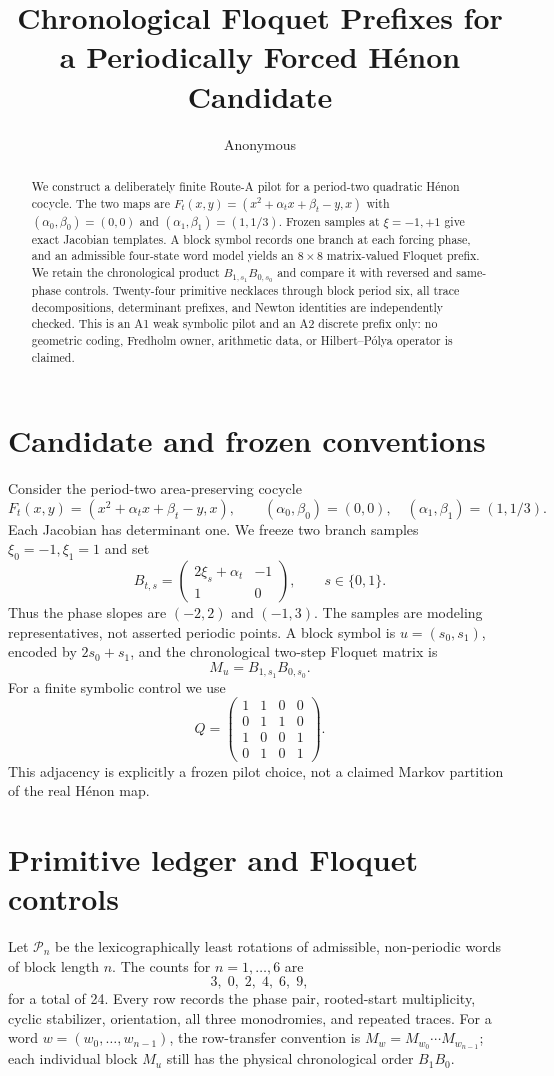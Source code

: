\documentclass[10pt]{article}
\title{Chronological Floquet Prefixes for a Periodically Forced H\'enon Candidate}
\author{Anonymous}
\date{}
\begin{document}
\maketitle
\begin{abstract}
We construct a deliberately finite Route-A pilot for a period-two quadratic
H\'enon cocycle.  The two maps are
$F_t(x,y)=(x^2+\alpha_t x+\beta_t-y,x)$ with
$(\alpha_0,\beta_0)=(0,0)$ and $(\alpha_1,\beta_1)=(1,1/3)$.
Frozen samples at $\xi=-1,+1$ give exact Jacobian templates.  A block symbol
records one branch at each forcing phase, and an admissible four-state word
model yields an $8\times8$ matrix-valued Floquet prefix.  We retain the
chronological product $B_{1,s_1}B_{0,s_0}$ and compare it with reversed and
same-phase controls.  Twenty-four primitive necklaces through block period
six, all trace decompositions, determinant prefixes, and Newton identities are
independently checked.  This is an A1 weak symbolic pilot and an A2 discrete
prefix only: no geometric coding, Fredholm owner, arithmetic data, or
Hilbert--P\'olya operator is claimed.
\end{abstract}

\section{Candidate and frozen conventions}
Consider the period-two area-preserving cocycle
\[
 F_t(x,y)=(x^2+\alpha_t x+\beta_t-y,x),\qquad
 (\alpha_0,\beta_0)=(0,0),\quad (\alpha_1,\beta_1)=(1,1/3).
\]
Each Jacobian has determinant one.  We freeze two branch samples
$\xi_0=-1,\xi_1=1$ and set
\[
 B_{t,s}=\begin{pmatrix}2\xi_s+\alpha_t&-1\\1&0\end{pmatrix},
 \qquad s\in\{0,1\}.
\]
Thus the phase slopes are $(-2,2)$ and $(-1,3)$.  The samples are modeling
representatives, not asserted periodic points.  A block symbol is
$u=(s_0,s_1)$, encoded by $2s_0+s_1$, and the chronological two-step
Floquet matrix is
\[
 M_u=B_{1,s_1}B_{0,s_0}.
\]
For a finite symbolic control we use
\[
 Q=\begin{pmatrix}1&1&0&0\\0&1&1&0\\1&0&0&1\\0&1&0&1\end{pmatrix}.
\]
This adjacency is explicitly a frozen pilot choice, not a claimed Markov
partition of the real H\'enon map.

\section{Primitive ledger and Floquet controls}
Let $\mathcal P_n$ be the lexicographically least rotations of admissible,
non-periodic words of block length $n$.  The counts for $n=1,\ldots,6$ are
\[
 3,\;0,\;2,\;4,\;6,\;9,
\]
for a total of 24.  Every row records the phase pair, rooted-start
multiplicity, cyclic stabilizer, orientation, all three monodromies, and
repeated traces.  For a word $w=(w_0,\ldots,w_{n-1})$, the row-transfer
convention is $M_w=M_{w_0}\cdots M_{w_{n-1}}$; each individual block $M_u$
still has the physical chronological order $B_1B_0$.
\end{document}
